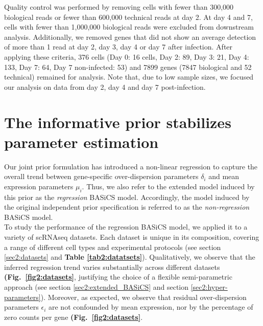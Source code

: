Quality control was performed by removing cells with fewer than 300,000 biological reads or fewer than 600,000 technical reads at day 2. At day 4 and 7, cells with fewer than 1,000,000 biological reads were excluded from downstream analysis. Additionally, we removed genes that did not show an average detection of more than 1 read at day 2, day 3, day 4 or day 7 after infection. After applying these criteria, 376 cells (Day 0: 16 cells, Day 2: 89, Day 3: 21, Day 4: 133, Day 7: 64, Day 7 non-infected: 53) and 7899 genes (7847 biological and 52 technical) remained for analysis. Note that, due to low sample sizes, we focused our analysis on data from day 2, day 4 and day 7 post-infection.


\section{The informative prior stabilizes parameter estimation}

Our joint prior formulation has introduced a non-linear regression to capture the overall trend between gene-specific over-dispersion parameters $\delta_i$ and mean expression parameters $\mu_i$. Thus, we also refer to the extended model induced by this prior as the \textit{regression} BASiCS model. Accordingly, the model induced by the original independent prior specification \citep{Vallejos2016a} is referred to as the \textit{non-regression} BASiCS model.\\ 

To study the performance of the regression BASiCS model, we applied it to a variety of scRNAseq datasets. Each dataset is unique in its composition, covering a range of different cell types and experimental protocols (see section \ref{sec2:datasets} and \textbf{Table \ref{tab2:datatsets}}). Qualitatively, we observe that the inferred regression trend varies substantially across different datasets \textbf{(Fig.~\ref{fig2:datasets}}, justifying the choice of a flexible semi-parametric approach (see section \ref{sec2:extended_BASiCS} and section \ref{sec2:hyper-parameters}). Moreover, as expected, we observe that residual over-dispersion parameters $\epsilon_i$ are not confounded by mean expression, nor by the percentage of zero counts per gene \textbf{(Fig.~\ref{fig2:datasets}}. \\

\newpage

